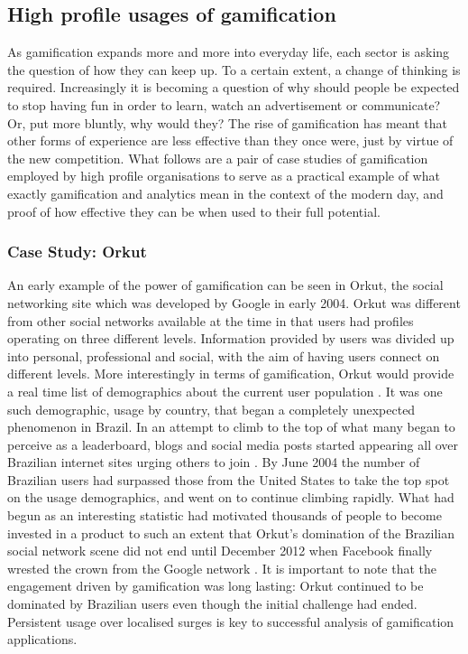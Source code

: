 \documentclass[12pt]{article}
\begin{document}
\subsection{High profile usages of gamification}
As gamification expands more and more into everyday life, each sector is asking the question of how they can keep up. To a certain extent, a change of thinking is required. Increasingly it is becoming a question of why should people be expected to stop having fun in order to learn, watch an advertisement or communicate? \cite{zichermann2010game} Or, put more bluntly, why would they? The rise of gamification has meant that other forms of experience are less effective than they once were, just by virtue of the new competition. What follows are a pair of case studies of gamification employed by high profile organisations to serve as a practical example of what exactly gamification and analytics mean in the context of the modern day, and proof of how effective they can be when used to their full potential.

\subsubsection{Case Study: Orkut}

An early example of the power of gamification can be seen in Orkut, the social networking site which was developed by Google in early 2004. Orkut was different from other social networks available at the time in that users had profiles operating on three different levels. Information provided by users was divided up into personal, professional and social, with the aim of having users connect on different levels. More interestingly in terms of gamification, Orkut would provide a real time list of demographics about the current user population \cite{fragoso2006wtf}. It was one such demographic, usage by country, that began a completely unexpected phenomenon in Brazil. In an attempt to climb to the top of what many began to perceive as a leaderboard, blogs and social media posts started appearing all over Brazilian internet sites urging others to join \cite{zichermann2010game}. By June 2004 the number of Brazilian users had surpassed those from the United States to take the top spot on the usage demographics, and went on to continue climbing rapidly. What had begun as an interesting statistic had motivated thousands of people to become invested in a product to such an extent that Orkut's domination of the Brazilian social network scene did not end until December 2012 when Facebook finally wrested the crown from the Google network \cite{1_comscore_2012}. It is important to note that the engagement driven by gamification was long lasting: Orkut continued to be dominated by Brazilian users even though the initial challenge had ended. Persistent usage over localised surges is key to successful analysis of gamification applications.
\end{document}
